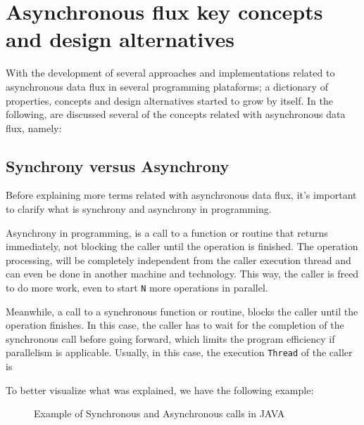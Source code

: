 
\section{Asynchronous flux key concepts and design alternatives} %
\label{sec:async_concepts}

With the development of several approaches and implementations related to asynchronous data flux in several programming plataforms; a dictionary
of properties, concepts and design alternatives started to grow by itself. In the following, are discussed several of the concepts related with asynchronous data flux, namely:


\subsection{Synchrony versus Asynchrony}

	Before explaining more terms related with asynchronous data flux, it's important to clarify what is synchrony and asynchrony in programming. 
	
	Asynchrony in programming, is a call to a function or routine that returns immediately, not blocking the caller until the operation is finished. The operation processing, will be completely independent from the caller execution thread and can even be done in another machine and technology. This way, the caller is freed to do more work, even to start \texttt{N} more operations in parallel. 
	
	Meanwhile, a call to a synchronous function or routine, blocks the caller until the operation finishes. In this case, the caller has to wait for the completion of the synchronous call before going forward, which limits the program efficiency if parallelism is applicable.
	Usually, in this case, the execution \texttt{Thread} of the caller is 

	To better visualize what was explained, we have the following example: 


	\begin{figure}[htbp]
		\centering
		\begin{subfigure}[h]{0.4\textwidth}
			\centering
			\caption{}
			\label{fig:ra-vectorial}
		 \end{subfigure}	
	\qquad
		 \begin{subfigure}[h]{0.4\textwidth}
			\centering
			\caption{}
			\label{fig:ra-raster}
		\end{subfigure}		
	  \caption{Example of Synchronous and Asynchronous calls in JAVA}
	  \label{fig:figura-completa}
	\end{figure}

